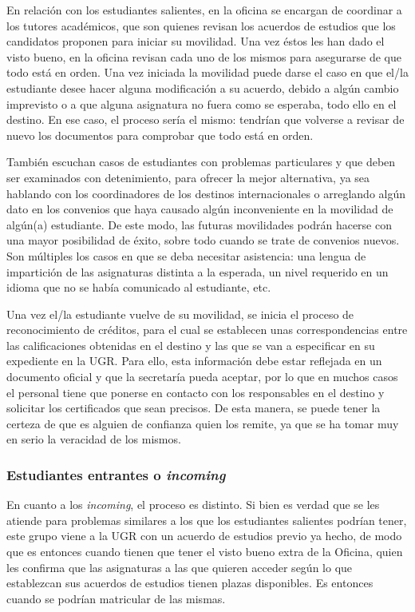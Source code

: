 En relación con los estudiantes salientes, en la oficina se encargan de coordinar a los tutores académicos, que son quienes revisan los acuerdos de estudios que los candidatos proponen para iniciar su movilidad. Una vez éstos les han dado el visto bueno, en la oficina revisan cada uno de los mismos para asegurarse de que todo está en orden. Una vez iniciada la movilidad puede darse el caso en que el/la estudiante desee hacer alguna modificación a su acuerdo, debido a algún cambio imprevisto o a que alguna asignatura no fuera como se esperaba, todo ello en el destino. En ese caso, el proceso sería el mismo: tendrían que volverse a revisar de nuevo los documentos para comprobar que todo está en orden.

También escuchan casos de estudiantes con problemas particulares y que deben ser examinados con detenimiento, para ofrecer la mejor alternativa, ya sea hablando con los coordinadores de los destinos internacionales o arreglando algún dato en los convenios que haya causado algún inconveniente en la movilidad de algún(a) estudiante. De este modo, las futuras movilidades podrán hacerse con una mayor posibilidad de éxito, sobre todo cuando se trate de convenios nuevos. Son múltiples los casos en que se deba necesitar asistencia: una lengua de impartición de las asignaturas distinta a la esperada, un nivel requerido en un idioma que no se había comunicado al estudiante, etc.

Una vez el/la estudiante vuelve de su movilidad, se inicia el proceso de reconocimiento de créditos, para el cual se establecen unas correspondencias entre las calificaciones obtenidas en el destino y las que se van a especificar en su expediente en la UGR. Para ello, esta información debe estar reflejada en un documento oficial y que la secretaría pueda aceptar, por lo que en muchos casos el personal tiene que ponerse en contacto con los responsables en el destino y solicitar los certificados que sean precisos. De esta manera, se puede tener la certeza de que es alguien de confianza quien los remite, ya que se ha tomar muy en serio la veracidad de los mismos.

\subsubsection{Estudiantes entrantes o \textit{incoming}}

En cuanto a los \textit{incoming}, el proceso es distinto. Si bien es verdad que se les atiende para problemas similares a los que los estudiantes salientes podrían tener, este grupo viene a la UGR con un acuerdo de estudios previo ya hecho, de modo que es entonces cuando tienen que tener el visto bueno extra de la Oficina, quien les confirma que las asignaturas a las que quieren acceder según lo que establezcan sus acuerdos de estudios tienen plazas disponibles. Es entonces cuando se podrían matricular de las mismas.

